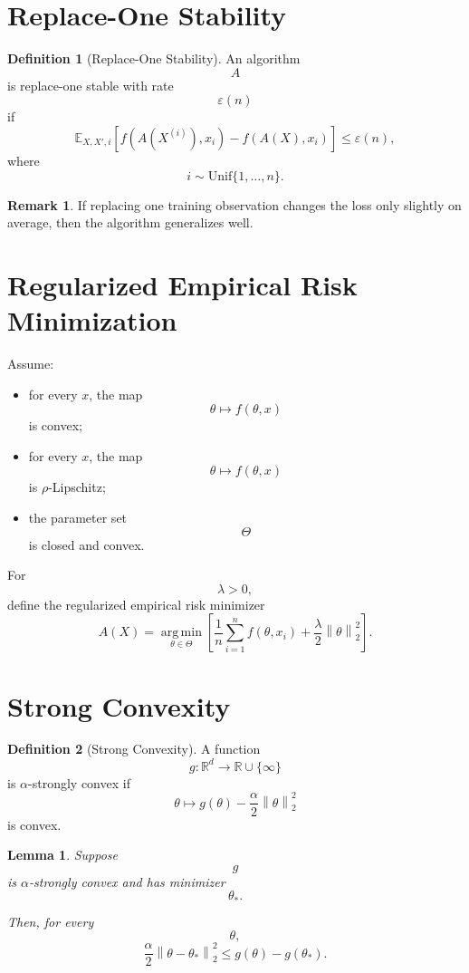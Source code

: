 \documentclass[12pt,oneside]{book}
\numberwithin{equation}{section}
\theoremstyle{definition}
\newtheorem{definition}{Definition}[section]
\newtheorem{remark}{Remark}[section]
\theoremstyle{plain}
\newtheorem{lemma}{Lemma}[section]
\theoremstyle{remark}
\newcommand{\R}{\mathbb{R}}
\newcommand{\E}{\mathbb{E}}
\newcommand{\argmin}{\operatorname*{arg\,min}}
\newcommand{\norm}[1]{\left\lVert #1 \right\rVert}
\begin{document}
\section{Replace-One Stability}

\begin{definition}[Replace-One Stability]
An algorithm
\[
A
\]
is replace-one stable with rate
\[
\varepsilon(n)
\]
if
\[
\E_{X,X',i}
\left[
f(A(X^{(i)}),x_i)
-
f(A(X),x_i)
\right]
\leq
\varepsilon(n),
\]
where
\[
i\sim \mathrm{Unif}\{1,\dots,n\}.
\]
\end{definition}

\begin{remark}
If replacing one training observation changes the loss only slightly on average, then the algorithm generalizes well.
\end{remark}

\section{Regularized Empirical Risk Minimization}

Assume:
\begin{itemize}
\item for every $x$, the map
\[
\theta\mapsto f(\theta,x)
\]
is convex;
\item for every $x$, the map
\[
\theta\mapsto f(\theta,x)
\]
is $\rho$-Lipschitz;
\item the parameter set
\[
\Theta
\]
is closed and convex.
\end{itemize}

For
\[
\lambda>0,
\]
define the regularized empirical risk minimizer
\[
A(X)
=
\argmin_{\theta\in\Theta}
\left[
\frac{1}{n}\sum_{i=1}^n f(\theta,x_i)
+
\frac{\lambda}{2}\norm{\theta}_2^2
\right].
\]

\section{Strong Convexity}

\begin{definition}[Strong Convexity]
A function
\[
g:\R^d\to\R\cup\{\infty\}
\]
is $\alpha$-strongly convex if
\[
\theta\mapsto
g(\theta)-\frac{\alpha}{2}\norm{\theta}_2^2
\]
is convex.
\end{definition}

\begin{lemma}
Suppose
\[
g
\]
is $\alpha$-strongly convex and has minimizer
\[
\theta_*.
\]

Then, for every
\[
\theta,
\]
\[
\frac{\alpha}{2}\norm{\theta-\theta_*}_2^2
\leq
g(\theta)-g(\theta_*).
\]
\end{lemma}
\end{document}

